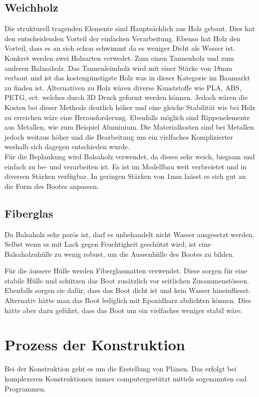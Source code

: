 \subsection{Weichholz}
Die strukturell tragenden Elemente sind Hauptsächlich aus Holz gebaut. Dies hat den entscheidenden Vorteil der einfachen Verarbeitung. Ebenso hat Holz den Vorteil, dass es an sich schon schwimmt da es weniger Dicht als Wasser ist. Konkret werden zwei Holzarten verwedet. Zum einen Tannenholz und zum anderen Balasaholz. Das Tannenleimholz wird mit einer Stärke von 18mm verbaut und ist das kostengünstigste Holz was in dieser Kategorie im Baumarkt zu finden ist.
Alternativen zu Holz wären diverse Kunststoffe wie PLA, ABS, PETG, ect. welches durch 3D Druck geformt werden können. Jedoch wären die Kosten bei dieser Methode deutlich höher und eine gleiche Stabilität wie bei Holz zu erreichen wäre eine Herausforderung.
Ebenfalls möglich sind Rippenelemente aus Metallen, wie zum Beispiel Aluminium. Die Materialkosten sind bei Metallen jedoch weitaus höher und die Bearbeitung um ein vielfaches Komplizierter weshalb sich dagegen entschieden wurde.
\\
Für die Beplankung wird Balsaholz verwendet, da dieses sehr weich, biegsam und einfach zu be- und verarbeiten ist. Es ist im Modellbau weit verbreietet und in diversen Stärken verfügbar. In geringen Stärken von 1mm laässt es sich gut an die Form des Bootes anpassen.

\subsection{Fiberglas}
Da Balsaholz sehr porös ist, darf es unbehandelt nicht Wasser ausgesetzt werden. Selbst wenn es mit Lack gegen Feuchtigkeit geschützt wird, ist eine Balsaholzuhülle zu wenig robust, um die Aussenhülle des Bootes zu bilden.

Für die äussere Hülle werden Fiberglasmatten verwendet. Diese sorgen für eine stabile Hülle und schützen das Boot zusätzlich vor seitlichen Zusammenstössen. Ebenfalls sorgen sie dafür, dass das Boot dicht ist und kein Wasser hineinfliesst. Alternativ hätte man das Boot lediglich mit Epoxidharz abdichten können. Dies hätte aber dazu geführt, dass das Boot um ein vielfaches weniger stabil wäre. 

\section{Prozess der Konstruktion}
Bei der Konstruktion geht es um die Erstellung von Plänen. Das erfolgt bei komplexeren Konstruktionen immer computergestützt mittels sogenannten \ac{cad} Programmen. 

